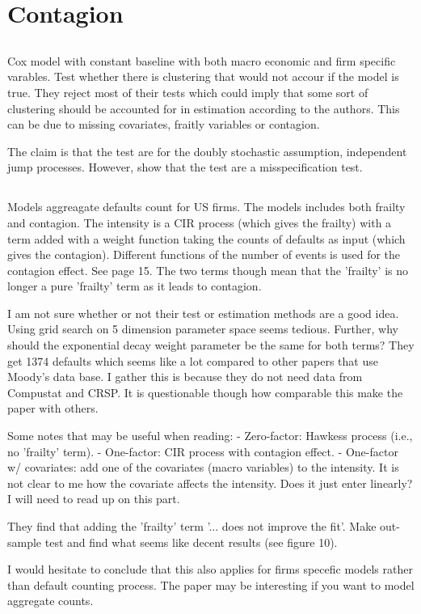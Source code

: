 \documentclass{article}
\makeatletter
\newcommand{\seccite}[1]{\subsection{\cite{#1}}\label{sec:#1}}
\newcommand\scite[1]{%
  \@ifundefined{r@sec:#1}{%
    \cite{#1}%
  }{%
    \citet[see section~\ref{sec:#1},][]{#1}%
  }%
}
\makeatother
\begin{document}
\section{Contagion}
\seccite{das07}
Cox model with constant baseline with both macro economic and firm specific varables. Test whether there is clustering that would not accour if the model is true. They reject most of their tests which could imply that some sort of clustering should be accounted for in estimation according to the authors. This can be due to missing covariates, fraitly variables or contagion. 

The claim is that the test are for the doubly stochastic assumption, independent jump processes. However, \scite{lando10} show that the test are a misspecification test.



\seccite{azizpour08}
Models aggreagate defaults count for US firms. The models includes both frailty and contagion. The intensity is a CIR process (which gives the frailty) with a term added with a weight function taking the counts of defaults as input (which gives the contagion). Different functions of the number of events is used for the contagion effect. See page 15. The two terms though mean that the 'frailty' is no longer a pure 'frailty' term as it leads to contagion.

I am not sure whether or not their test or estimation methods are a good idea. Using grid search on 5 dimension parameter space seems tedious. Further, why should the exponential decay weight parameter be the same for both terms? They get 1374 defaults which seems like a lot compared to other papers that use Moody's data base. I gather this is because they do not need data from Compustat and CRSP. It is questionable though how comparable this make the paper with others.

Some notes that may be useful when reading: 
- Zero-factor: Hawkess process (i.e., no 'frailty' term).
- One-factor: CIR process with contagion effect.
- One-factor w/ covariates: add one of the covariates (macro variables) to the intensity. It is not clear to me how the covariate affects the intensity. Does it just enter linearly? I will need to read up on this part. 

They find that adding the 'frailty' term '... does not improve the fit'. Make out-sample test and find what seems like decent results (see figure 10).   

I would hesitate to conclude that this also applies for firms specefic models rather than default counting process. The paper may be interesting if you want to model aggregate counts.
\end{document}
